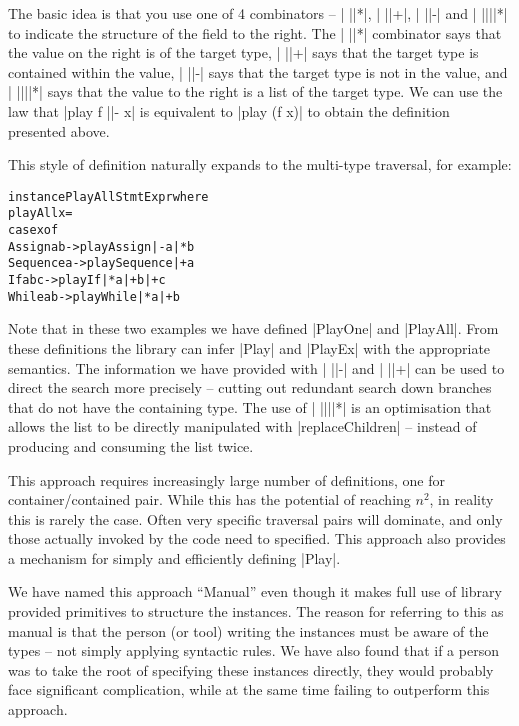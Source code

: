 \documentclass[preprint]{sigplanconf}
\newenvironment{code}{\begin{alltt}\small}{\end{alltt}}
\begin{document}
The basic idea is that you use one of 4 combinators -- | ||*|, | ||+|, | ||-| and | ||||*| to indicate the structure of the field to the right. The | ||*| combinator says that the value on the right is of the target type, | ||+| says that the target type is contained within the value, | ||-| says that the target type is not in the value, and | ||||*| says that the value to the right is a list of the target type. We can use the law that |play f ||- x| is equivalent to |play (f x)| to obtain the definition presented above.

This style of definition naturally expands to the multi-type traversal, for example:

\begin{code}
instance PlayAll Stmt Expr where
    playAll x =
        case x of
            Assign    a b    -> play Assign    |-  a |*  b
            Sequence  a      -> play Sequence  |+  a
            If        a b c  -> play If        |*  a |+  b |+ c
            While     a b    -> play While     |*  a |+  b
\end{code}

Note that in these two examples we have defined |PlayOne| and |PlayAll|. From these definitions the library can infer |Play| and |PlayEx| with the appropriate semantics. The information we have provided with | ||-| and | ||+| can be used to direct the search more precisely -- cutting out redundant search down branches that do not have the containing type. The use of | ||||*| is an optimisation that allows the list to be directly manipulated with |replaceChildren| -- instead of producing and consuming the list twice.

This approach requires increasingly large number of definitions, one for container/contained pair. While this has the potential of reaching $n^2$, in reality this is rarely the case. Often very specific traversal pairs will dominate, and only those actually invoked by the code need to specified. This approach also provides a mechanism for simply and efficiently defining |Play|.

We have named this approach ``Manual'' even though it makes full use of library provided primitives to structure the instances. The reason for referring to this as manual is that the person (or tool) writing the instances must be aware of the types -- not simply applying syntactic rules. We have also found that if a person was to take the root of specifying these instances directly, they would probably face significant complication, while at the same time failing to outperform this approach.
\end{document}
